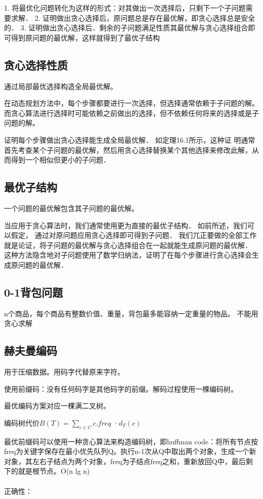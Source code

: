 \documentclass[cn,hazy,blue,screen,14pt]{note}
\begin{document}
1. 将最优化问题转化为这样的形式：对其做出一次选择后，只剩下一个子问题需要求解．
2. 证明做出贪心选择后，原问题总是存在最优解，即贪心选择总是安全的．
3. 证明做出贪心选择后．剩余的子问题满足性质其最优解与贪心选择组合即可得到原问题的最优解，这样就得到了最优子结构\\

\subsection{贪心选择性质}
通过局部最优选择构造全局最优解。

在动态规划方法中，每个步骤都要进行一次选择，但选择通常依赖于子问题的解。而贪心算法进行选择时可能依赖之前做出的选择，但不依赖任何将来的选择或是子问题的解。

证明每个步骤做出贪心选择能生成全局最优解． 如定理16.1所示，这种证
明通常首先考查某个子问题的最优解，然后用贪心选择替换某个其他选择来修改此解，从而得到一个相似但更小的子问题．

\subsection{最优子结构}
一个问题的最优解包含其子问题的最优解。

当应用于贪心算法时，我们通常使用更为直接的最优子结构． 如前所述，我们可以假定， 通过对原问题应用贪心选择即可得到子问题． 我们兀正要做的全部工作就是论证，将子问题的最优解与贪心选择组合在一起就能生成原问题的最优解． 这种方法隐含地对子问题使用了数学归纳法，证明了在每个步骤进行贪心选择会生成原问题的最优解．

\subsection{0-1背包问题}
n个商品，每个商品有整数价值、重量，背包最多能容纳一定重量的物品。
不能用贪心求解

\subsection{赫夫曼编码}
用于压缩数据。用码字代替原来字符。

使用前缀码：没有任何码字是其他码字的前缀。解码过程使用一棵编码树。

最优编码方案对应一棵满二叉树。

编码树代价$B(T)=\sum _{c\in C}c.freq$ ·$d_{T}(c)$

最优前缀码可以使用一种贪心算法来构造编码树，即huffman code：将所有节点按freq为关键字保存在最小优先队列Q。执行n-1次从Q中取出两个对象，生成一个新对象，其左右子结点为两个对象，freq为子结点freq之和，重新放回Q中，最后剩下的就是根节点。O(n lg n)
\\
\\
正确性：
\end{document}
